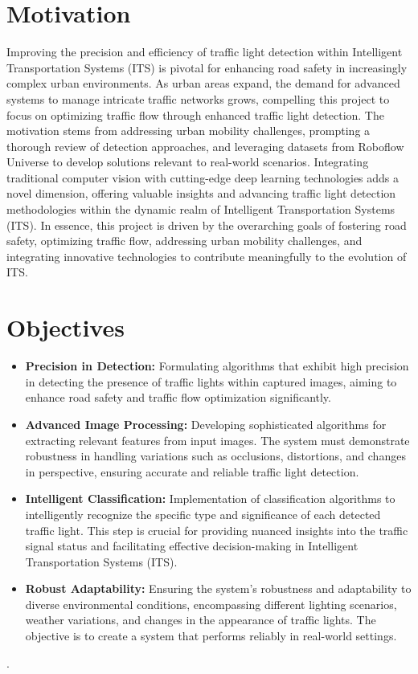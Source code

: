 \documentclass[12 pt]{report}
\begin{document}
\section{Motivation}
\justify
Improving the precision and efficiency of traffic light detection within Intelligent Transportation Systems (ITS) is pivotal for enhancing road safety in increasingly complex urban environments. As urban areas expand, the demand for advanced systems to manage intricate traffic networks grows, compelling this project to focus on optimizing traffic flow through enhanced traffic light detection. The motivation stems from addressing urban mobility challenges, prompting a thorough review of detection approaches, and leveraging datasets from Roboflow Universe to develop solutions relevant to real-world scenarios. Integrating traditional computer vision with cutting-edge deep learning technologies adds a novel dimension, offering valuable insights and advancing traffic light detection methodologies within the dynamic realm of Intelligent Transportation Systems (ITS). In essence, this project is driven by the overarching goals of fostering road safety, optimizing traffic flow, addressing urban mobility challenges, and integrating innovative technologies to contribute meaningfully to the evolution of ITS.
\flushleft

\section{Objectives}
\begin{justify}
\begin{itemize}
  \item \textbf{Precision in Detection:} Formulating algorithms that exhibit high precision in detecting the presence of traffic lights within captured images, aiming to enhance road safety and traffic flow optimization significantly.

  \item \textbf{Advanced Image Processing:} Developing sophisticated algorithms for extracting relevant features from input images. The system must demonstrate robustness in handling variations such as occlusions, distortions, and changes in perspective, ensuring accurate and reliable traffic light detection.

  \item \textbf{Intelligent Classification:} Implementation of classification algorithms to intelligently recognize the specific type and significance of each detected traffic light. This step is crucial for providing nuanced insights into the traffic signal status and facilitating effective decision-making in Intelligent Transportation Systems (ITS).

  \item \textbf{Robust Adaptability:} Ensuring the system's robustness and adaptability to diverse environmental conditions, encompassing different lighting scenarios, weather variations, and changes in the appearance of traffic lights. The objective is to create a system that performs reliably in real-world settings.
\end{itemize}.
\end{justify}
\end{document}
